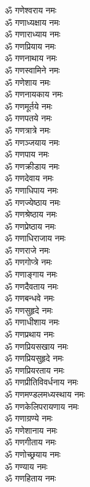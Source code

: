 \begin{multicols}{2}
\begin{flushleft}
ॐ गणेश्वराय नमः\\
ॐ गणाध्यक्षाय नमः\\
ॐ गणाराध्याय नमः\\
ॐ गणप्रियाय नमः\\
ॐ गणनाथाय नमः\\
ॐ गणस्वामिने नमः\\
ॐ गणेशाय नमः\\
ॐ गणनायकाय नमः\\
ॐ गणमूर्तये नमः\\
ॐ गणपतये नमः\hfill{}\\
ॐ गणत्रात्रे नमः\\
ॐ गणञ्जयाय नमः\\
ॐ गणपाय नमः\\
ॐ गणक्रीडाय नमः\\
ॐ गणदेवाय नमः\\
ॐ गणाधिपाय नमः\\
ॐ गणज्येष्ठाय नमः\\
ॐ गणश्रेष्ठाय नमः\\
ॐ गणप्रेष्ठाय नमः\\
ॐ गणाधिराजाय नमः\hfill{}\\
ॐ गणराजे नमः\\
ॐ गणगोप्त्रे नमः\\
ॐ गणाङ्गाय नमः\\
ॐ गणदैवताय नमः\\
ॐ गणबन्धवे नमः\\
ॐ गणसुहृदे नमः\\
ॐ गणाधीशाय नमः\\
ॐ गणप्रथाय नमः\\
ॐ गणप्रियसखाय नमः\\
ॐ गणप्रियसुहृदे नमः\hfill{}\\
ॐ गणप्रियरताय नमः\\
ॐ गणप्रीतिविवर्धनाय नमः\\
ॐ गणमण्डलमध्यस्थाय नमः\\
ॐ गणकेलिपरायणाय नमः\\
ॐ गणाग्रण्ये नमः\\
ॐ गणेशानाय नमः\\
ॐ गणगीताय नमः\\
ॐ गणोच्छ्रयाय नमः\\
ॐ गण्याय नमः\\
ॐ गणहिताय नमः\hfill{}\\

\end{flushleft}
\end{multicols}

